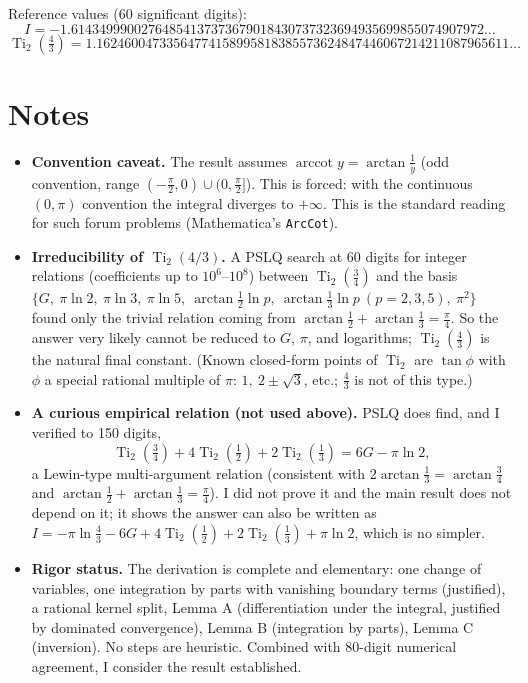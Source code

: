\documentclass[11pt]{article}
\theoremstyle{remark}
\begin{document}
Reference values (60 significant digits):
\[I=-1.61434999002764854137373679018430737323694935699855074907972\ldots\]
\[\operatorname{Ti}_2\!\left(\tfrac43\right)=1.16246004733564774158995818385573624847446067214211087965611\ldots\]

\section*{Notes}

\begin{itemize}
\item \textbf{Convention caveat.} The result assumes $\operatorname{arccot} y=\arctan\frac1y$ (odd convention, range $(-\frac\pi2,0)\cup(0,\frac\pi2]$). This is forced: with the continuous $(0,\pi)$ convention the integral diverges to $+\infty$. This is the standard reading for such forum problems (Mathematica's \texttt{ArcCot}).
\item \textbf{Irreducibility of $\operatorname{Ti}_2(4/3)$.} A PSLQ search at 60 digits for integer relations (coefficients up to $10^6$--$10^8$) between $\operatorname{Ti}_2(\frac34)$ and the basis $\{G,\ \pi\ln2,\ \pi\ln3,\ \pi\ln5,\ \arctan\!\frac12\ln p,\ \arctan\!\frac13\ln p\ (p=2,3,5),\ \pi^2\}$ found only the trivial relation coming from $\arctan\frac12+\arctan\frac13=\frac\pi4$. So the answer very likely cannot be reduced to $G$, $\pi$, and logarithms; $\operatorname{Ti}_2(\frac43)$ is the natural final constant. (Known closed-form points of $\operatorname{Ti}_2$ are $\tan\phi$ with $\phi$ a special rational multiple of $\pi$: $1,\ 2\pm\sqrt3$, etc.; $\frac43$ is not of this type.)
\item \textbf{A curious empirical relation (not used above).} PSLQ does find, and I verified to 150 digits,
\[\operatorname{Ti}_2\!\left(\tfrac34\right)+4\operatorname{Ti}_2\!\left(\tfrac12\right)+2\operatorname{Ti}_2\!\left(\tfrac13\right)=6G-\pi\ln2,\]
a Lewin-type multi-argument relation (consistent with $2\arctan\frac13=\arctan\frac34$ and $\arctan\frac12+\arctan\frac13=\frac\pi4$). I did not prove it and the main result does not depend on it; it shows the answer can also be written as $I=-\pi\ln\frac43-6G+4\operatorname{Ti}_2(\frac12)+2\operatorname{Ti}_2(\frac13)+\pi\ln2$, which is no simpler.
\item \textbf{Rigor status.} The derivation is complete and elementary: one change of variables, one integration by parts with vanishing boundary terms (justified), a rational kernel split, Lemma A (differentiation under the integral, justified by dominated convergence), Lemma B (integration by parts), Lemma C (inversion). No steps are heuristic. Combined with 80-digit numerical agreement, I consider the result established.
\end{itemize}
\end{document}

